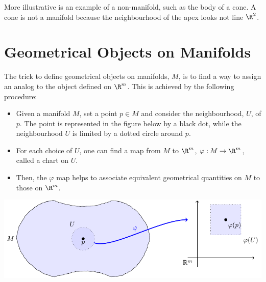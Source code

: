 More illustrative is an example of a non-manifold, such as the body of a cone. A cone is not a manifold because the neighbourhood of the apex looks not line $\R^2$.
\begin{center}
\end{center}

\section{Geometrical Objects on Manifolds}

The trick to define geometrical objects on  manifolds, $M$, is to find a way to assign an analog to the object defined on $\R^m$. This is achieved by the following procedure:
\begin{itemize}
\item Given a manifold $M$, set a point $p\in M$ and consider the neighbourhood, $U$, of $p$. The point is represented in the figure below by a black dot, while the neighbourhood $U$ is limited by a dotted circle around $p$.
\item For each choice of $U$, one can find a map from $M$ to $\R^m$, $\varphi:M\to \R^m$, called a chart on $U$.
\item Then, the $\varphi$ map helps to associate equivalent geometrical quantities on $M$ to those on $\R^m$.
\end{itemize}
\begin{center}
  \includegraphics[scale=1.1]{Pict/tikz-manifold.pdf}
\end{center}

